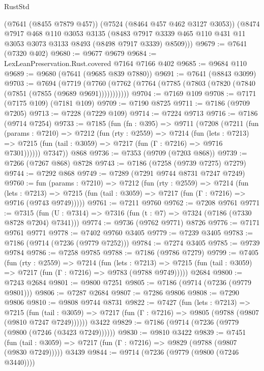 \begin{lexlean}{RustStd}
\begin{coremodule}
      (@7641 (@8455 @7879 @457))
      (@7524 (@8464 @457 @462 @3127 @3053))
      (@8474
        @7917
        @468
        @110
        @3053
        @3135
        (@8483 @7917 @3339 @465 @110 @431 @11 @3053 @3073 @3133 @8493 (@8498 @7917 @3339) @8509)))
@9679 := @7641 (@7320 @402)
@9680 := @9677 @9679
@9684 := LexLeanPreservation.Rust.covered @7164 @7166 @402
@9685 := @9684 @110
@9689 := @9680 (@7641 (@9685 @839 @7880))
@9691 := @7641 (@8843 @3099)
@9703 := @7694
    (@7719 (@7760 (@7762 (@7764 (@7785 (@7803 (@7820 (@7840 (@7851 (@7855 (@9689 @9691)))))))))))
@9704 := @7169 @109
@9708 := @7171 (@7175 @109) (@7181 @109)
@9709 := @7190 @8725
@9711 := @7186 (@9709 @7205)
@9713 := @7228 (@7229 @109)
@9714 := @7224 @9713
@9716 := @7186 (@9714 @7254)
@9733 := @7185
    (fun (fn : @395) =>
    @9711
      (@7208
        (@7211
          (fun (params : @7210) =>
          @7212
            (fun (rty : @2559) =>
            @7214
              (fun (lets : @7213) =>
              @7215 (fun (tail : @3059) => @7217 (fun (Γ : @7216) => @9716 @7301))))))
        @7347))
    @868
@9736 := @7353 (@9709 (@7203 @868))
@9739 := @7266 (@7267 @868) @8728
@9743 := @7186 (@7258 (@9739 @7275) @7279)
@9744 := @7292 @868
@9749 := @7289 (@7291 @9744 @8731 @7247 @7249)
@9760 := fun (params : @7210) =>
  @7212
    (fun (rty : @2559) =>
    @7214
      (fun (lets : @7213) =>
      @7215 (fun (tail : @3059) => @7217 (fun (Γ : @7216) => @9716 (@9743 @9749)))))
@9761 := @7211 @9760
@9762 := @7208 @9761
@9771 := @7315 (fun (U : @7314) => @7316 (fun (t : @7) => @7324 (@7186 (@7330 @8728 @7204) @7341)))
@9774 := @9736 (@9762 @9771) @8726
@9776 := @7171 @9761 @9771
@9778 := @7402 @9760 @3405
@9779 := @7239 @3405
@9783 := @7186 (@9714 (@7236 (@9779 @7252)))
@9784 := @7274 @3405
@9785 := @9739 @9784
@9786 := @7258 @9785
@9788 := @7186 (@9786 @7279)
@9799 := @7405
    (fun (rty : @2559) =>
    @7214
      (fun (lets : @7213) =>
      @7215 (fun (tail : @3059) => @7217 (fun (Γ : @7216) => @9783 (@9788 @9749)))))
    @2684
@9800 := @7243 @2684
@9801 := @9800 @7251
@9805 := @7186 (@9714 (@7236 (@9779 @9801)))
@9806 := @7287 @2684
@9807 := @7286 @9806
@9808 := @7290 @9806
@9810 := @9808 @9744 @8731
@9822 := @7427
    (fun (lets : @7213) =>
    @7215
      (fun (tail : @3059) => @7217 (fun (Γ : @7216) => @9805 (@9788 (@9807 (@9810 @7247 @7249))))))
    @3422
@9829 := @7186 (@9714 (@7236 (@9779 (@9800 (@7246 (@3423 @7249))))))
@9830 := @9810 @3422
@9839 := @7451
    (fun (tail : @3059) => @7217 (fun (Γ : @7216) => @9829 (@9788 (@9807 (@9830 @7249)))))
    @3439
@9844 := @9714 (@7236 (@9779 (@9800 (@7246 @3440))))

\end{coremodule}
\end{lexlean}
